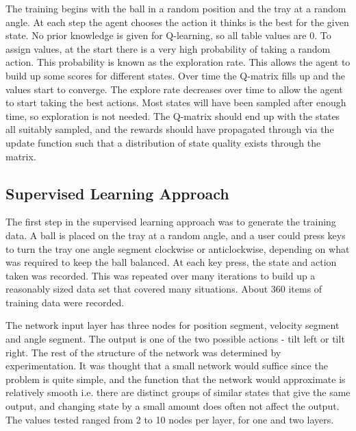 \documentclass[12pt,a4paper]{article}
\begin{document}
The training begins with the ball in a random position and the tray at a random angle. At each step the agent chooses the action it thinks is the best for the given state. No prior knowledge is given for Q-learning, so all table values are 0. To assign values, at the start there is a very high probability of taking a random action. This probability is known as the exploration rate. This allows the agent to build up some scores for different states. Over time the Q-matrix fills up and the values start to converge. The explore rate decreases over time to allow the agent to start taking the best actions. Most states will have been sampled after enough time, so exploration is not needed. The Q-matrix should end up with the states all suitably sampled, and the rewards should have propagated through via the update function such that a distribution of state quality exists through the matrix.

\subsection{Supervised Learning Approach}
The first step in the supervised learning approach was to generate the training data. A ball is placed on the tray at a random angle, and a user could press keys to turn the tray one angle segment clockwise or anticlockwise, depending on what was required to keep the ball balanced. At each key press, the state and action taken was recorded. This was repeated over many iterations to build up a reasonably sized data set that covered many situations. About 360 items of training data were recorded.

The network input layer has three nodes for position segment, velocity segment and angle segment. The output is one of the two possible actions - tilt left or tilt right. The rest of the structure of the network was determined by experimentation. It was thought that a small network would suffice since the problem is quite simple, and the function that the network would approximate is relatively smooth i.e. there are distinct groups of similar states that give the same output, and changing state by a small amount does often not affect the output. The values tested ranged from 2 to 10 nodes per layer, for one and two layers. 
\end{document}

